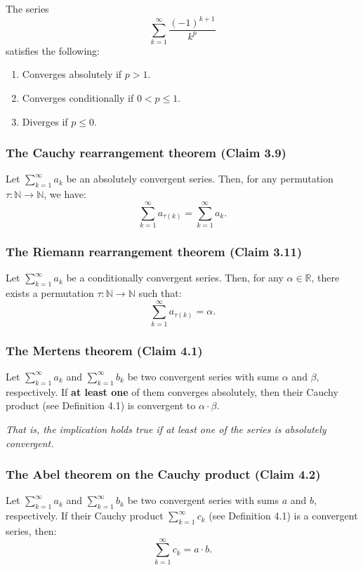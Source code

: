 The series
\[
    \sum_{k=1}^\infty \frac{(-1)^{k+1}}{k^p}
\]
satisfies the following:
\begin{enumerate}[label=(\arabic*)]
    \item Converges absolutely if $p > 1$.
    \item Converges conditionally if $0 < p \leq 1$.
    \item Diverges if $p \leq 0$.
\end{enumerate}

\subsubsection{The Cauchy rearrangement theorem (Claim 3.9)}


Let $\sum_{k=1}^\infty a_k$ be an absolutely convergent series. Then, for any permutation $\tau : \mathbb{N} \to \mathbb{N}$, we have:
\[
    \sum_{k=1}^\infty a_{\tau(k)} = \sum_{k=1}^\infty a_k.
\]

\subsubsection{The Riemann rearrangement theorem (Claim 3.11)}


Let $\sum_{k=1}^\infty a_k$ be a conditionally convergent series. Then, for any $\alpha \in \mathbb{R}$, there exists a permutation $\tau : \mathbb{N} \to \mathbb{N}$ such that:
\[
    \sum_{k=1}^\infty a_{\tau(k)} = \alpha.
\]

\subsubsection{The Mertens theorem (Claim 4.1)}


Let $\sum_{k=1}^\infty a_k$ and $\sum_{k=1}^\infty b_k$ be two convergent series with sums $\alpha$ and $\beta$, respectively. If \textbf{at least one} of them converges absolutely, then their Cauchy product (see Definition 4.1) is convergent to $\alpha \cdot \beta$.

\textit{That is, the implication holds true if at least one of the series is absolutely convergent.}

\subsubsection{The Abel theorem on the Cauchy product (Claim 4.2)}


Let $\sum_{k=1}^\infty a_k$ and $\sum_{k=1}^\infty b_k$ be two convergent series with sums $a$ and $b$, respectively. If their Cauchy product $\sum_{k=1}^\infty c_k$ (see Definition 4.1) is a convergent series, then:
\[
    \sum_{k=1}^\infty c_k = a \cdot b.
\]

